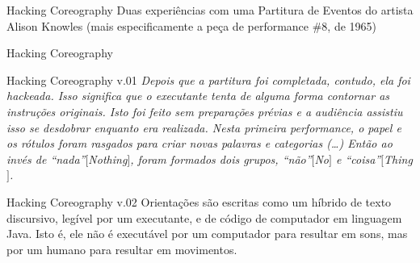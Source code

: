 \documentclass[aspectratio=169]{beamer}
\begin{document}
\begin{frame}{Hacking Coreography}
Duas experiências com uma Partitura de Eventos do artista Alison Knowles (mais especificamente a peça de performance \#8, de 1965)
\end{frame}


\begin{frame}{Hacking Coreography}
\oito
\end{frame}

\begin{frame}{Hacking Coreography v.01}
\emph{Depois que a partitura foi completada, contudo, ela foi \emph{hackeada}. Isso significa que o executante tenta de alguma forma contornar as instruções originais. Isto foi feito sem preparações prévias e a audiência assistiu isso se desdobrar enquanto era realizada. Nesta primeira performance, o papel e os rótulos foram rasgados para criar novas palavras e categorias (\ldots) Então ao invés de ``nada''$[$Nothing$]$, foram formados dois grupos, ``não''$[$No$]$ e ``coisa''$[$Thing$]$.} \cite[p.~31]{sichio_hacking_2004}
\end{frame}

\begin{frame}{Hacking Coreography v.02}
Orientações são escritas como um híbrido de texto discursivo, legível por um executante, e de código de computador em linguagem Java. Isto é, ele não é executável por um computador para resultar em sons, mas por um humano para resultar em movimentos.
\end{frame}
\end{document}
